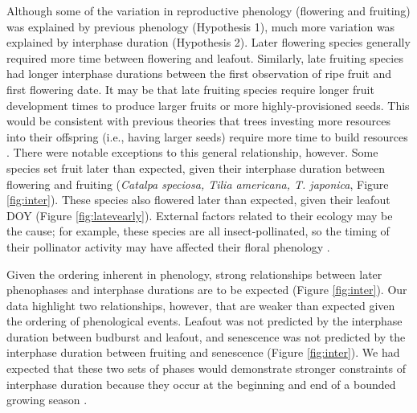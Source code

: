 \documentclass{article}
\begin{document}
\par Although some of the variation in reproductive phenology (flowering and fruiting) was explained by previous phenology (Hypothesis 1), much more variation was explained by interphase duration (Hypothesis 2). Later flowering species generally required more time between flowering and leafout. Similarly, late fruiting species had longer interphase durations between the first observation of ripe fruit and first flowering date. It may be that late fruiting species require longer fruit development times to produce larger fruits or more highly-provisioned seeds. This would be consistent with previous theories that trees investing more resources into their offspring (i.e., having larger seeds) require more time to build resources \citep{bolmgren2008,sun2011}. There were notable exceptions to this general relationship, however. Some species set fruit later than expected, given their interphase duration between flowering and fruiting (\textit{Catalpa speciosa, Tilia americana, T. japonica}, Figure \ref{fig:inter}). These species also flowered later than expected, given their leafout DOY (Figure \ref{fig:latevearly}). External factors related to their ecology may be the cause; for example, these species are all insect-pollinated, so the timing of their pollinator activity may have affected their floral phenology \citep{elzinga2007}.  

\par Given the ordering inherent in phenology, strong relationships between later phenophases and interphase durations are to be expected (Figure \ref{fig:inter}). Our data highlight two relationships, however, that are weaker than expected given the ordering of phenological events. Leafout was not predicted by the interphase duration between budburst and leafout, and senescence was not predicted by the interphase duration between fruiting and senescence (Figure \ref{fig:inter}). We had expected that these two sets of phases would demonstrate stronger constraints of interphase duration because they occur at the beginning and end of a bounded growing season \citep{letten2013}.
\end{document}

